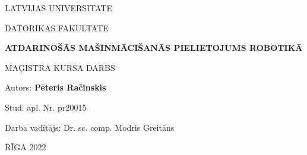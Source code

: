 \begin{titlepage}
    \begin{center}
        \vspace*{3cm}
        
        LATVIJAS UNIVERSITĀTE

        DATORIKAS FAKULTĀTE

        \vspace*{4cm}

        \large\textbf{ATDARINOŠĀS MAŠĪNMĀCĪŠANĀS PIELIETOJUMS ROBOTIKĀ}
        
        \vspace{2cm}
        \normalsize{MAĢISTRA KURSA DARBS}
         
             
    \end{center}
    \vspace{3cm}
    \begin{addmargin}[18em]{0em}
    Autors: \textbf{Pēteris Račinskis}
    \end{addmargin}

    \begin{addmargin}[18em]{0em}
    \hspace{1cm} Stud. apl. Nr. pr20015
    \end{addmargin}

    \begin{addmargin}[18em]{0em}
    Darba vadītājs: Dr. sc. comp. Modris Greitāns
    \end{addmargin}
         
    \vfill
    \begin{center}
    RĪGA 2022
    \end{center}
 \end{titlepage}